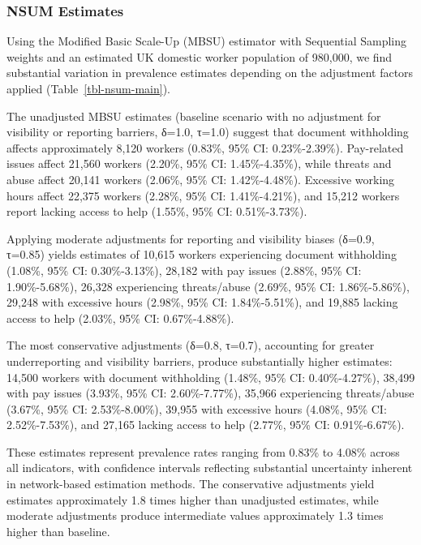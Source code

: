 \documentclass[
  12pt,
  letterpaper,
  DIV=11,
  numbers=noendperiod]{scrartcl}
\theoremstyle{plain}
\theoremstyle{definition}
\begin{document}
\subsubsection{NSUM Estimates}\label{nsum-estimates}

Using the Modified Basic Scale-Up (MBSU) estimator with Sequential
Sampling weights and an estimated UK domestic worker population of
980,000, we find substantial variation in prevalence estimates depending
on the adjustment factors applied (Table~\ref{tbl-nsum-main}).

The unadjusted MBSU estimates (baseline scenario with no adjustment for
visibility or reporting barriers, δ=1.0, τ=1.0) suggest that document
withholding affects approximately 8,120 workers (0.83\%, 95\% CI:
0.23\%-2.39\%). Pay-related issues affect 21,560 workers (2.20\%, 95\%
CI: 1.45\%-4.35\%), while threats and abuse affect 20,141 workers
(2.06\%, 95\% CI: 1.42\%-4.48\%). Excessive working hours affect 22,375
workers (2.28\%, 95\% CI: 1.41\%-4.21\%), and 15,212 workers report
lacking access to help (1.55\%, 95\% CI: 0.51\%-3.73\%).

Applying moderate adjustments for reporting and visibility biases
(δ=0.9, τ=0.85) yields estimates of 10,615 workers experiencing document
withholding (1.08\%, 95\% CI: 0.30\%-3.13\%), 28,182 with pay issues
(2.88\%, 95\% CI: 1.90\%-5.68\%), 26,328 experiencing threats/abuse
(2.69\%, 95\% CI: 1.86\%-5.86\%), 29,248 with excessive hours (2.98\%,
95\% CI: 1.84\%-5.51\%), and 19,885 lacking access to help (2.03\%, 95\%
CI: 0.67\%-4.88\%).

The most conservative adjustments (δ=0.8, τ=0.7), accounting for greater
underreporting and visibility barriers, produce substantially higher
estimates: 14,500 workers with document withholding (1.48\%, 95\% CI:
0.40\%-4.27\%), 38,499 with pay issues (3.93\%, 95\% CI: 2.60\%-7.77\%),
35,966 experiencing threats/abuse (3.67\%, 95\% CI: 2.53\%-8.00\%),
39,955 with excessive hours (4.08\%, 95\% CI: 2.52\%-7.53\%), and 27,165
lacking access to help (2.77\%, 95\% CI: 0.91\%-6.67\%).

These estimates represent prevalence rates ranging from 0.83\% to 4.08\%
across all indicators, with confidence intervals reflecting substantial
uncertainty inherent in network-based estimation methods. The
conservative adjustments yield estimates approximately 1.8 times higher
than unadjusted estimates, while moderate adjustments produce
intermediate values approximately 1.3 times higher than baseline.
\end{document}

